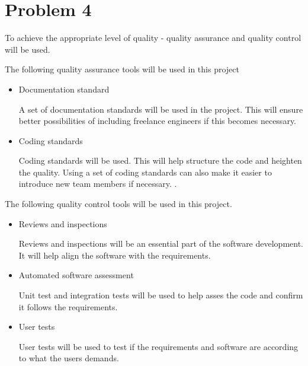 \chapter{Problem 4}
To achieve the appropriate level of quality - quality assurance and quality control will be used.
\begin{description}[align=left]
	\setlength\itemsep{0.1em}
	\item The following quality assurance tools will be used in this project
	\begin{itemize}
		\item Documentation standard
		
			A set of documentation standards will be used in the project. This will ensure better possibilities of including freelance engineers if this becomes necessary.
			
		\item Coding standards
		
			Coding standards will be used. This will help structure the code and heighten the quality. Using a set of coding standards can also make it easier to introduce new team members if necessary.
			. 
	\end{itemize}
	\item The following quality control tools will be used in this project.
	
	\begin{itemize}
		\item Reviews and inspections
		
			Reviews and inspections will be an essential part of the software development. It will help align the software with the requirements.
		\item Automated software assessment
		
			Unit test and integration tests will be used to help asses the code and confirm it follows the requirements. 
		\item User tests
			
			User tests will be used to test if the requirements and software are according to what the users demands. 
	\end{itemize}
\end{description}